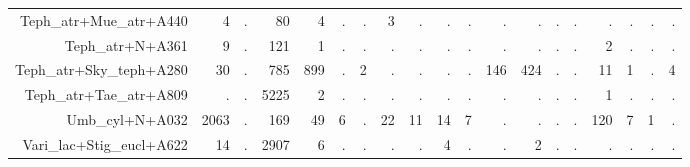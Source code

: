 \documentclass[a4paper, 11]{article}\usepackage[]{graphicx}\usepackage[]{color}
\begin{document}
\begin{table}
\begin{tabular}{rrrrrrrrrrrrrrrrrrr}
  Teph\_atr+Mue\_atr+A440 & 4 & . & 80 & 4 & . & . & 3 & . & . & . & . & . & . & . & . & . & . & . \\ 
  Teph\_atr+N+A361 & 9 & . & 121 & 1 & . & . & . & . & . & . & . & . & . & . & 2 & . & . & . \\ 
  Teph\_atr+Sky\_teph+A280 & 30 & . & 785 & 899 & . & 2 & . & . & . & . & 146 & 424 & . & . & 11 & 1 & . & 4 \\ 
  Teph\_atr+Tae\_atr+A809 & . & . & 5225 & 2 & . & . & . & . & . & . & . & . & . & . & 1 & . & . & . \\ 
  Umb\_cyl+N+A032 & 2063 & . & 169 & 49 & 6 & . & 22 & 11 & 14 & 7 & . & . & . & . & 120 & 7 & 1 & . \\ 
  Vari\_lac+Stig\_eucl+A622 & 14 & . & 2907 & 6 & . & . & . & . & 4 & . & . & 2 & . & . & . & . & . & . \\ 
   \hline
\end{tabular}
\end{table}
\end{document}
